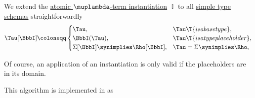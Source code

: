 \begin{algorithm}\label{alg:simple_type_schema_instantiation}
  We extend the \hyperref[def:atomic_lambda_instantiation]{atomic \( \muplambda \)-term instantiation} \( \BbbI \) to all \hyperref[def:simple_type_schema]{simple type schemas} straightforwardly
  \begin{equation}\label{eq:alg:simple_type_schema_instantiation}
    \Tau[\BbbI] \coloneqq \begin{cases}
      \Tau,                                  &\Tau \T{is a base type},        \\
      \BbbI(\Tau),                           &\Tau \T{is a type placeholder}, \\
      \Sigma[\BbbI] \synimplies \Rho[\BbbI], &\Tau = \Sigma \synimplies \Rho, \\
    \end{cases}
  \end{equation}
\end{algorithm}
\begin{comments}
  \item Of course, an application of an instantiation is only valid if the placeholders are in its domain.
  \item This algorithm is implemented in \cite{notebook:code} as
  \begin{CodeRefDisplay}
  \end{CodeRefDisplay}
\end{comments}


